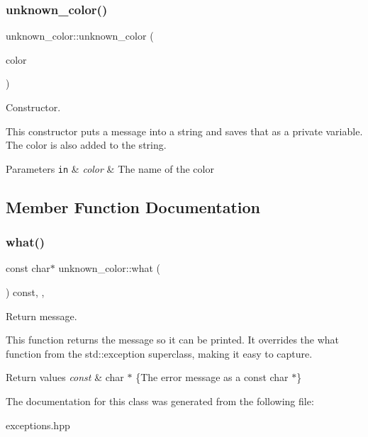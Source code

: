 \subsubsection{\texorpdfstring{unknown\+\_\+color()}{unknown\_color()}}
{\footnotesize\ttfamily unknown\+\_\+color\+::unknown\+\_\+color (\begin{DoxyParamCaption}\item[{const std\+::string}]{color }\end{DoxyParamCaption})\hspace{0.3cm}{\ttfamily [inline]}}



Constructor. 

This constructor puts a message into a string and saves that as a private variable. The color is also added to the string.


\begin{DoxyParams}[1]{Parameters}
\mbox{\tt in}  & {\em color} & The name of the color \\
\hline
\end{DoxyParams}


\subsection{Member Function Documentation}
\mbox{\label{classunknown__color_a3340e3af5b5f734727b73ddf25df3265}} 
\subsubsection{\texorpdfstring{what()}{what()}}
{\footnotesize\ttfamily const char$\ast$ unknown\+\_\+color\+::what (\begin{DoxyParamCaption}{ }\end{DoxyParamCaption}) const\hspace{0.3cm}{\ttfamily [inline]}, {\ttfamily [override]}, {\ttfamily [noexcept]}}



Return message. 

This function returns the message so it can be printed. It overrides the what function from the std\+::exception superclass, making it easy to capture.


\begin{DoxyRetVals}{Return values}
{\em const} & char $\ast$ \{The error message as a const char $\ast$\} \\
\hline
\end{DoxyRetVals}


The documentation for this class was generated from the following file\+:\begin{DoxyCompactItemize}
\item 
exceptions.\+hpp\end{DoxyCompactItemize}
